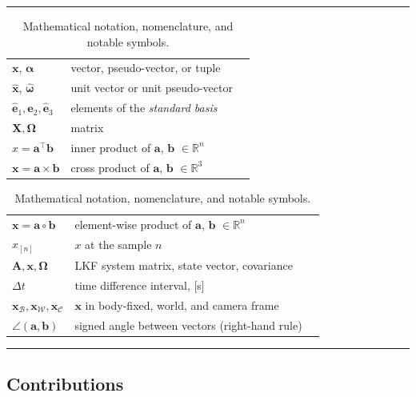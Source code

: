 \documentclass[a4paper,11pt,titlepage,twoside]{book}
\begin{document}
\begin{table}
  \scriptsize
  \centering
  \noindent\rule{\textwidth}{0.5pt}
  \begin{tabular}{lll}
    $\mathbf{x}$, $\bm{\alpha}$ & vector, pseudo-vector, or tuple\\
    $\mathbf{\hat{x}}$, $\bm{\hat{\omega}}$& unit vector or unit pseudo-vector\\
    $\mathbf{\hat{e}}_1, \mathbf{\hat{e}}_2, \mathbf{\hat{e}}_3$ & elements of the \emph{standard basis} \\
    $\mathbf{X}, \bm{\Omega}$ & matrix \\
    $x = \mathbf{a}^\intercal\mathbf{b}$ & inner product of $\mathbf{a}$, $\mathbf{b}$ $\in \mathbb{R}^n$\\
    $\mathbf{x} = \mathbf{a}\times\mathbf{b}$ & cross product of $\mathbf{a}$, $\mathbf{b}$ $\in \mathbb{R}^3$\\
  \end{tabular}%
  \begin{tabular}{lll}
    $\mathbf{x} = \mathbf{a}\circ\mathbf{b}$ & element-wise product of $\mathbf{a}$, $\mathbf{b}$ $\in \mathbb{R}^n$ \\
    $x_{[n]}$ & $x$ at the sample $n$ \\
    $\mathbf{A}, \mathbf{x}, \mathbf{\Omega}$ & LKF system matrix, state vector, covariance\\
    $\Delta t$ & time difference interval, [\si{\second}] \\
    $\mathbf{x}_\mathcal{B}, \mathbf{x}_\mathcal{W}, \mathbf{x}_\mathcal{C}$ & $\mathbf{x}$ in body-fixed, world, and camera frame \\
    $\angle\left(\mathbf{a}, \mathbf{b}\right)$ & signed angle between vectors (right-hand rule) \\
  \end{tabular}
  \noindent\rule{\textwidth}{0.5pt}
  \caption{Mathematical notation, nomenclature, and notable symbols.}
  \label{tab:nomenclature}
\end{table}



\subsection{Contributions}
\end{document}
